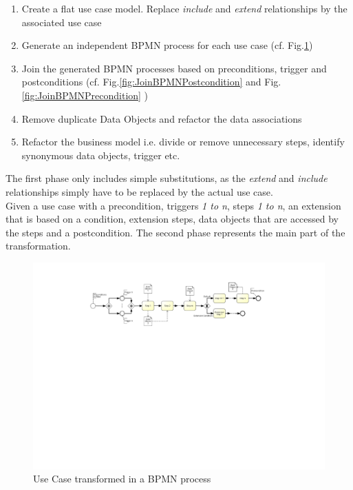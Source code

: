 \begin{enumerate}
	\item Create a flat use case model. Replace \textit{include} and \textit{extend} relationships by the associated use case
	\item Generate an independent BPMN process for each use case (cf. Fig.\ref{fig:useCaseTransformation})
	\item Join the generated BPMN processes based on preconditions, trigger and postconditions (cf. Fig.\ref{fig:JoinBPMNPostcondition} and Fig.\ref{fig:JoinBPMNPrecondition} )
	\item Remove duplicate Data Objects and refactor the data associations
	\item Refactor the business model i.e. divide or remove unnecessary steps, identify synonymous data objects, trigger etc.
\end{enumerate}


\noindent
The first phase only includes simple substitutions, as the \textit{extend} and \textit{include} relationships simply have to be replaced by the actual use case.\\
Given a use case with a precondition, triggers \textit{1 to n}, steps \textit{1 to n}, an extension that is based on a condition, extension steps, data objects that are accessed by the steps and a postcondition. The second phase represents the main part of the transformation.  


\begin{figure}[h!]
	\includegraphics[width=\textwidth, trim={6cm 14.5cm 6cm 1.5cm}]{img/usecaseTransformation.pdf}
	\caption{Use Case transformed in a BPMN process}
	\label{fig:useCaseTransformation}
\end{figure}

